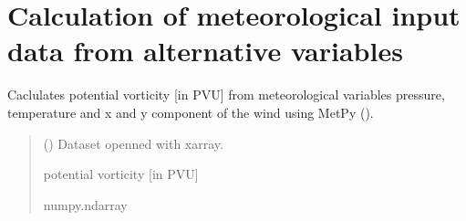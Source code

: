 \documentclass[a4paper,11pt,english]{sphinxmanual}
\begin{document}
\section{Calculation of meteorological input data from alternative variables}
\label{\detokenize{modules:module-envlib.calc_altrv_vars}}\label{\detokenize{modules:calculation-of-meteorological-input-data-from-alternative-variables}}

\begin{fulllineitems}
\label{\detokenize{modules:envlib.calc_altrv_vars.get_pvu}}
\pysigstartsignatures
{}
\pysigstopsignatures
\sphinxAtStartPar
Caclulates potential vorticity {[}in PVU{]} from meteorological variables pressure, temperature and x and y component of the wind using MetPy ().
\begin{quote}\begin{description}
\sphinxAtStartPar
{} () \textendash{} Dataset openned with xarray.

\sphinxAtStartPar
potential vorticity {[}in PVU{]}

\sphinxAtStartPar
numpy.ndarray

\end{description}\end{quote}

\end{fulllineitems}

\end{document}
